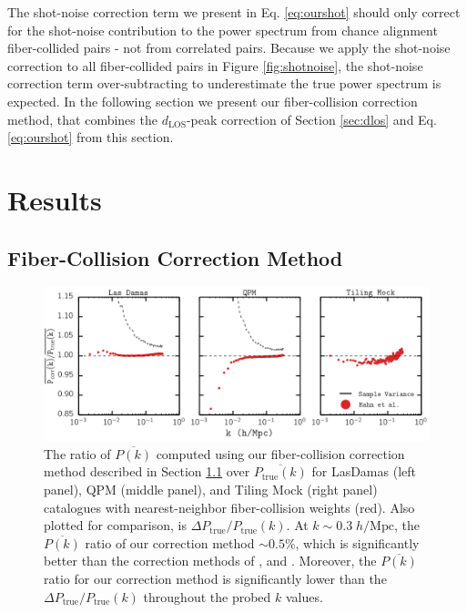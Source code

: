\documentclass{emulateapj}
\begin{document}
The shot-noise correction term we present in Eq. \ref{eq:ourshot} should only correct for the shot-noise contribution to the power spectrum from chance alignment fiber-collided pairs - not from correlated pairs. Because we apply the shot-noise correction to all fiber-collided pairs in Figure \ref{fig:shotnoise}, the shot-noise correction term over-subtracting to underestimate the true power spectrum is expected. In the following section we present our fiber-collision correction method, that combines the $d_\mathrm{LOS}$-peak correction of Section \ref{sec:dlos} and Eq. \ref{eq:ourshot} from this section. 

\section{Results} 
\subsection{Fiber-Collision Correction Method} \label{sec:apply} 
\begin{figure}
\begin{center}
\includegraphics[scale=0.55]{fcpaper_pk_peakshotnoise_mpfit_comp.png} 
\caption{The ratio of $\overline{P(k)}$ computed using our fiber-collision correction method described in Section \ref{sec:apply} over $\overline{P_\mathrm{true}(k)}$ for LasDamas (left panel), QPM (middle panel), and Tiling Mock (right panel) catalogues with nearest-neighbor fiber-collision weights (red). Also plotted for comparison, is $\Delta P_\mathrm{true}/P_\mathrm{true}(k)$. At $k \sim 0.3 \; h/\mathrm{Mpc}$, the $\overline{P(k)}$ ratio of our correction method $\sim 0.5 \%$, which is significantly better than the correction methods of \cite{Anderson:2012aa}, \cite{Beutler:2014aa} and \cite{Gil-Marin:2014aa}. Moreover, the $\overline{P(k)}$ ratio for our correction method is significantly lower than the $\Delta P_\mathrm{true}/P_\mathrm{true}(k)$ throughout the probed $k$ values.}\label{fig:peaksn}
\end{center}
\end{figure}
\end{document}
